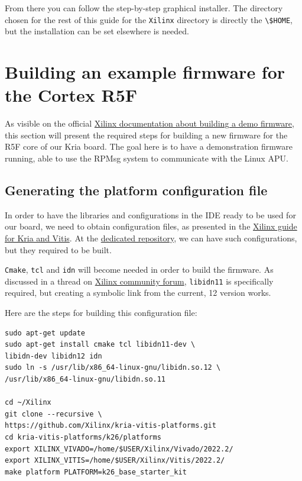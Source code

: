 \documentclass[10pt]{article}
\begin{document}
From there you can follow the step-by-step graphical installer.
The directory chosen for the rest of this guide for the \verb|Xilinx| directory
is directly the \verb|\$HOME|, but the installation can be set elsewhere is needed.


\section{Building an example firmware for the Cortex R5F}
\label{sec:bulding-an-example}
As visible on the official \href{https://xilinx-wiki.atlassian.net/wiki/spaces/A/pages/1837006921/OpenAMP+Base+Hardware+Configurations\#Build-RPU-firmware}{Xilinx documentation about building a demo firmware}, this section will present the required steps for building a new firmware for the R5F core of our Kria board. The goal
here is to have a demonstration firmware running, able to use the RPMsg system to communicate with the Linux APU.

\subsection{Generating the platform configuration file}
\label{sec:gener-platf-conf}
In order to have the libraries and configurations in the IDE ready to be used for our board, we need to obtain configuration files, as presented in the 
\href{https://xilinx.github.io/kria-apps-docs/kv260/2022.1/build/html/docs/build_vitis_platform.html?highlight=xsa}{Xilinx guide for Kria and Vitis}. At the \href{https://github.com/Xilinx/kria-vitis-platforms}{dedicated repository}, we can have such configurations, but they required to be built.

\verb|Cmake|, \verb|tcl| and \verb|idn| will become needed in order to build the firmware.
As discussed in a thread on \href{https://support.xilinx.com/s/question/0D52E00006jrzsYSAQ/platform-project-cannot-be-created-on-vitis?language=en\_US}{Xilinx community forum}, \verb|libidn11| is specifically required, but creating a symbolic link from the current, 12 version works.

Here are the steps for building this configuration file:
\begin{tcolorbox}
\begin{verbatim}
sudo apt-get update
sudo apt-get install cmake tcl libidn11-dev \
libidn-dev libidn12 idn
sudo ln -s /usr/lib/x86_64-linux-gnu/libidn.so.12 \
/usr/lib/x86_64-linux-gnu/libidn.so.11

cd ~/Xilinx
git clone --recursive \
https://github.com/Xilinx/kria-vitis-platforms.git
cd kria-vitis-platforms/k26/platforms
export XILINX_VIVADO=/home/$USER/Xilinx/Vivado/2022.2/
export XILINX_VITIS=/home/$USER/Xilinx/Vitis/2022.2/
make platform PLATFORM=k26_base_starter_kit
\end{verbatim}
\end{tcolorbox}
\end{document}

